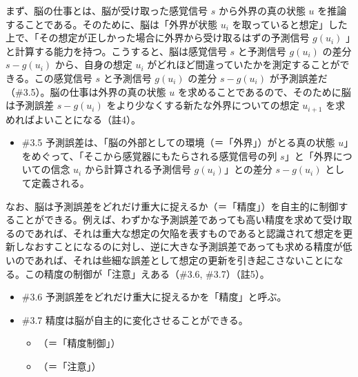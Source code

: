 まず、脳の仕事とは、脳が受け取った感覚信号 \(s\) から外界の真の状態
\(u\) を推論することである。そのために、脳は「外界が状態 \(u_i\)
を取っていると想定」した上で、「その想定が正しかった場合に外界から受け取るはずの予測信号
\(g(u_i)\) 」と計算する能力を持つ。こうすると、脳は感覚信号 \(s\)
と予測信号 \(g(u_i)\) の差分 \(s-g(u_i)\) から、自身の想定 \(u_i\)
がどれほど間違っていたかを測定することができる。この感覚信号 \(s\)
と予測信号 \(g(u_i)\) の差分 \(s-g(u_i)\)
が\mbox{予測誤差}だ（\#3.5）。脳の仕事は外界の真の状態 \(u\)
を求めることであるので、そのために脳は\mbox{予測誤差} \(s-g(u_i)\)
をより少なくする新たな外界についての想定 \(u_{i+1}\)
を求めればよいことになる（註4）。

\begin{note}{}
  \begin{itemize}
    \tightlist
    \item{\#3.5}
      \mbox{予測誤差}は、「脳の外部としての環境（＝「外界」）がとる真の状態 $u$」をめぐって、「そこから感覚器にもたらされる感覚信号の列 $s$」と「外界についての信念 $u_i$ から計算される予測信号 $g(u_i)$」との差分 $s-g(u_i)$ として定義される。
  \end{itemize}
\end{note}

なお、脳は\mbox{予測誤差}をどれだけ重大に捉えるか（＝「精度」）を自主的に制御することができる。例えば、わずかな\mbox{予測誤差}であっても高い精度を求めて受け取るのであれば、それは重大な想定の欠陥を表すものであると認識されて想定を更新しなおすことになるのに対し、逆に大きな\mbox{予測誤差}であっても求める精度が低いのであれば、それは些細な誤差として想定の更新を引き起こさないことになる。この精度の制御が「注意」えある（\#3.6,
\#3.7）（註5）。

\begin{note}{}
  \begin{itemize}
    \tightlist
    \item{\#3.6}
      \mbox{予測誤差}をどれだけ重大に捉えるかを「精度」と呼ぶ。
    \item{\#3.7}
      精度は脳が自主的に変化させることができる。
      \begin{itemize}
          \tightlist
          \item
          （＝「精度制御」）
          \item
          （＝「注意」）
        \end{itemize}
  \end{itemize}
\end{note}

